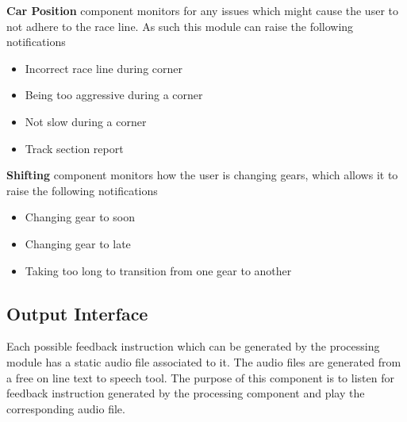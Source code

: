 \textbf{Car Position} component monitors for any issues which might cause the user to not adhere to the race line. As such this module can raise the following notifications 
\begin{itemize}
	\item Incorrect race line during corner
	\item Being too aggressive during a corner
	\item Not slow during a corner
	\item Track section report
\end{itemize}

\textbf{Shifting} component monitors how the user is changing gears, which allows it to raise the following notifications
\begin{itemize}
	\item Changing gear to soon
	\item Changing gear to late
	\item Taking too long to transition from one gear to another
\end{itemize}

\subsection{Output Interface}
Each possible feedback instruction which can be generated by the processing module has a static audio file associated to it. The audio files are generated from a free on line text to speech tool. The purpose of this component is to listen for feedback instruction generated by the processing component and play the corresponding audio file.